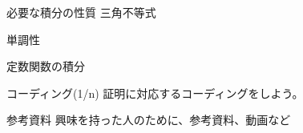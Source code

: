 \documentclass[unicode,12pt]{beamer}%
\begin{document}
\begin{frame}{必要な積分の性質}
  三角不等式

  単調性

  定数関数の積分
\end{frame}

\begin{frame}{コーディング(1/n)}
  証明に対応するコーディングをしよう。
\end{frame}

\begin{frame}{参考資料}
  興味を持った人のために、参考資料、動画など
\end{frame}
\end{document}
